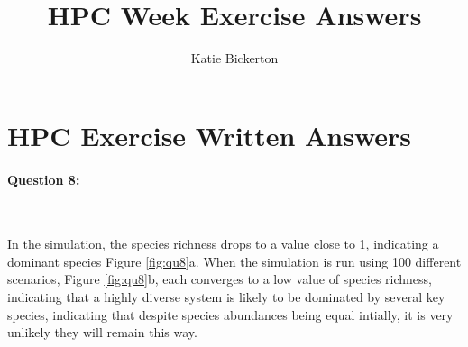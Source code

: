\documentclass{article}
\title{HPC Week Exercise Answers}
\author{Katie Bickerton}
\begin{document}
\section*{HPC Exercise Written Answers}


\paragraph{Question 8:}\

\noindent \newline In the simulation, the species richness drops to a value close to 1, indicating a dominant species Figure \ref{fig:qu8}a. When the simulation is run using 100 different scenarios, Figure \ref{fig:qu8}b, each converges to a low value of species richness, indicating that a highly diverse system is likely to be dominated by several key species, indicating that despite species abundances being equal intially, it is very unlikely they will remain this way.  \newline
\end{document}
